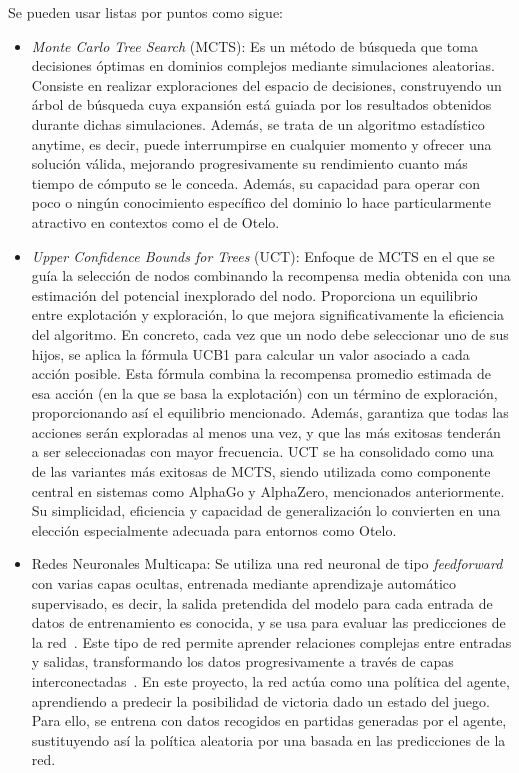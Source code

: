 \documentclass[conference,a4paper]{IEEEtran}
\begin{document}
Se pueden usar listas por puntos como sigue:
\begin{itemize}
\item \emph{Monte Carlo Tree Search} (MCTS): Es un método de búsqueda que toma decisiones óptimas en dominios complejos mediante simulaciones aleatorias. Consiste en realizar exploraciones del espacio de decisiones, construyendo un árbol de búsqueda cuya expansión está guiada por los resultados obtenidos durante dichas simulaciones. Además, se trata de un algoritmo estadístico anytime, es decir, puede interrumpirse en cualquier momento y ofrecer una solución válida, mejorando progresivamente su rendimiento cuanto más tiempo de cómputo se le conceda. Además, su capacidad para operar con poco o ningún conocimiento específico del dominio lo hace particularmente atractivo en contextos como el de Otelo.
\item \emph{Upper Confidence Bounds for Trees} (UCT): Enfoque de MCTS en el que se guía la selección de nodos combinando la recompensa media obtenida con una estimación del potencial inexplorado del nodo. Proporciona un equilibrio entre explotación y exploración, lo que mejora significativamente la eficiencia del algoritmo. En concreto, cada vez que un nodo debe seleccionar uno de sus hijos, se aplica la fórmula UCB1 para calcular un valor asociado a cada acción posible. Esta fórmula combina la recompensa promedio estimada de esa acción (en la que se basa la explotación) con un término de exploración, proporcionando así el equilibrio mencionado. Además, garantiza que todas las acciones serán exploradas al menos una vez, y que las más exitosas tenderán a ser seleccionadas con mayor frecuencia. UCT se ha consolidado como una de las variantes más exitosas de MCTS, siendo utilizada como componente central en sistemas como AlphaGo y AlphaZero, mencionados anteriormente. Su simplicidad, eficiencia y capacidad de generalización lo convierten en una elección especialmente adecuada para entornos como Otelo.
\item Redes Neuronales Multicapa: Se utiliza una red neuronal de tipo \emph{feedforward} con varias capas ocultas, entrenada mediante aprendizaje automático supervisado, es decir, la salida pretendida del modelo para cada entrada de datos de entrenamiento es conocida, y se usa para evaluar las predicciones de la red~\cite{b3}. Este tipo de red permite aprender relaciones complejas entre entradas y salidas, transformando los datos progresivamente a través de capas interconectadas~\cite{b4}. En este proyecto, la red actúa como una política del agente, aprendiendo a predecir la posibilidad de victoria dado un estado del juego. Para ello, se entrena con datos recogidos en partidas generadas por el agente, sustituyendo así la política aleatoria por una basada en las predicciones de la red.
\end{itemize}
\end{document}
